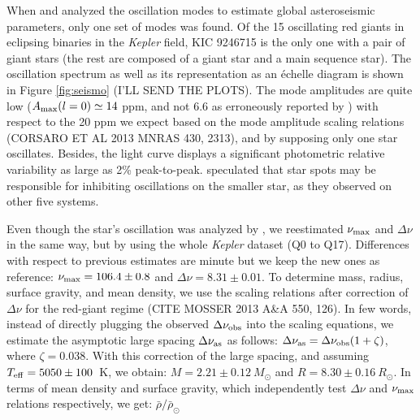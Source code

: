When \citet{gau13} and \citet{gau14} analyzed the oscillation modes to estimate global asteroseismic parameters, only one set of modes was found. Of the 15 oscillating red giants in eclipsing binaries in the \emph{Kepler} field, KIC 9246715 is the only one with a pair of giant stars (the rest are composed of a giant star and a main sequence star). The oscillation spectrum as well as its representation as an \'echelle diagram is shown in Figure \ref{fig:seismo} (I'LL SEND THE PLOTS). The mode amplitudes are quite low ($A_{\rm{max}}(l=0) \simeq 14$ ppm, and not 6.6 as erroneously reported by \citealt{gau14}) with respect to the 20 ppm we expect  based on the mode amplitude scaling relations (CORSARO ET AL 2013 MNRAS 430, 2313), and by supposing only one star oscillates. Besides, the light curve displays a significant photometric relative variability as large as 2\% peak-to-peak. \citet{gau14} speculated that star spots may be responsible for inhibiting oscillations on the smaller star, as they observed on other five systems. 

Even though the star's oscillation was analyzed by \citet{gau14}, we reestimated $\nu_{\rm{max}}$ and $\Delta\nu$ in the same way, but by using the whole \textit{Kepler} dataset (Q0 to Q17). Differences with respect to previous estimates are minute but we keep the new ones as reference: $\nu_{\rm{max}} = 106.4 \pm 0.8$ and $\Delta\nu=8.31\pm0.01$. To determine mass, radius, surface gravity, and mean density, we use the scaling relations after correction of $\Delta\nu$ for the red-giant regime (CITE MOSSER 2013 A\&A 550, 126). In few words, instead of directly plugging the observed $\Delta\nu_{\rm{obs}}$ into the scaling equations, we estimate the asymptotic large spacing $\Delta\nu_{\rm{as}}$ as follows: $\Delta\nu_{\rm{as}} = \Delta\nu_{\rm{obs}} (1 + \zeta)$, where $\zeta = 0.038$. With this correction of the large spacing, and assuming $T_{\rm{eff}} = 5050 \pm 100$~K, we obtain: $M = 2.21 \pm 0.12 \ M_{\odot}$ and $R = 8.30 \pm 0.16 \ R_{\odot}$. In terms of mean density and surface gravity, which independently test $\Delta\nu$  and $\nu_{\rm{max}}$ relations respectively, we get:  $\bar{\rho}/\bar{\rho}_{\odot}$ 


